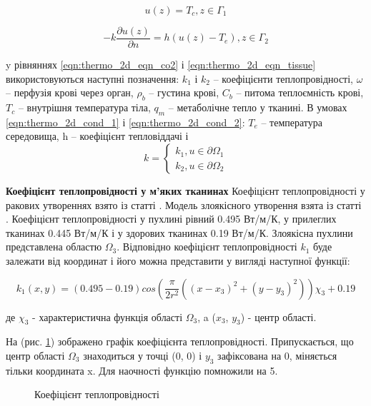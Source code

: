 \begin{equation}
    \label{eqn:thermo_2d_cond_1}
    u(z) = T_c, z \in \Gamma_1
\end{equation}

\begin{equation}
    \label{eqn:thermo_2d_cond_2}
    -k\dfrac{\partial{u(z)}}{\partial{n}} = h(u(z) - T_e), z \in \Gamma_2
\end{equation}

\noindent y рівняннях \ref{eqn:thermo_2d_eqn_co2} і \ref{eqn:thermo_2d_eqn_tissue} використовуються наступні позначення:
$k_1$ і $k_2$ -- коефіцієнти теплопровідності, $\omega$ -- перфузія крові через орган, $\rho_b$ -- густина крові, $C_b$ 
-- питома теплоємність крові, $T_c$ -- внутрішня температура тіла, $q_m$ -- метаболічне тепло у тканині. В умовах 
\ref{eqn:thermo_2d_cond_1} і \ref{eqn:thermo_2d_cond_2}: $T_e$ -- температура середовища, h -- коефіцієнт тепловіддачі і
$$k=\begin{cases}
k_1, u \in \partial{\Omega_1} \\
k_2, u \in \partial{\Omega_2}
\end{cases}
$$

\textbf{Коефіцієнт теплопровідності у м'яких тканинах} Коефіцієнт теплопровідності у ракових утвореннях взято із статті 
\cite{lung-tumor-thermal-conductivity}. Модель злоякісного утворення взята із статті \cite{tumor-thermal-model}.
Коефіцієнт теплопровідності у пухлині рівний 0.495 Вт/м/К, у прилеглих тканинах 0.445 Вт/м/К і у здорових тканинах 
0.19 Вт/м/К. Злоякісна пухлини представлена областю $\Omega_3$. Відповідно коефіцієнт теплопровідності $k_1$ буде 
залежати від координат і його можна представити у вигляді наступної функції:

\begin{equation}
    \label{eqn:thermo_2d_thermal_conductivity}
    k_1(x, y) = (0.495 - 0.19)cos(\frac{\pi}{2r^2}((x - x_3)^2 + (y - y_3)^2))\chi_3 + 0.19
\end{equation}

\noindent де $\chi_3$ - характеристична функція області $\Omega_3$, a ($x_3$, $y_3$) - центр області.

\noindent На (рис. \ref{fig:thermo_2d_thermal_conductivity}) зображено графік коефіцієнта теплопровідності. 
Припускається, що центр області $\Omega_3$ знаходиться у точці (0, 0) і $y_3$ зафіксована на 0, міняється тільки 
координата x. Для наочності функцію помножили на 5. 

\begin{figure}[ht!]
    \centering
    \caption{Коефіцієнт теплопровідності}
    \label{fig:thermo_2d_thermal_conductivity}
\end{figure}

